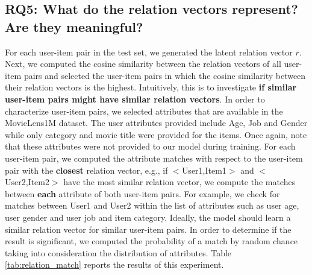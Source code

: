 \documentclass[sigconf]{acmart}
\begin{document}
\subsection{RQ5: What do the relation vectors represent? Are they meaningful?}
For each user-item pair in the test set, we generated the latent relation vector $r$. Next, we computed the cosine similarity between
the relation vectors of all user-item pairs and selected the user-item pairs in which the cosine similarity between their relation vectors
is the highest. Intuitively, this is to investigate \textbf{if similar user-item pairs might have similar relation vectors}. In order to characterize user-item pairs, we selected attributes that are available in the MovieLens1M dataset. The user attributes provided include Age, Job and Gender while only category and movie title were provided for the items. Once again, note that these attributes were not provided to our model during training. For each user-item pair, we computed the attribute matches with respect to the user-item pair with the \textbf{closest} relation vector, e.g., if $<$User1,Item1$>$ and $<$User2,Item2$>$ have the most similar relation vector, we compute the matches between \textbf{each} attribute of both user-item pairs. For example, we check for matches between User1 and User2 within the list of attributes such as user age, user gender and user job and item category. Ideally, the model should learn a similar relation vector for similar user-item pairs. In order to determine if the result is significant, we computed the probability of a match by random chance taking into consideration the distribution of attributes. Table \ref{tab:relation_match} reports the results of this experiment. 
\end{document}
